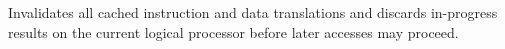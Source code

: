 Invalidates all cached instruction and data translations and discards in-progress results on the current logical processor before later accesses may proceed.
